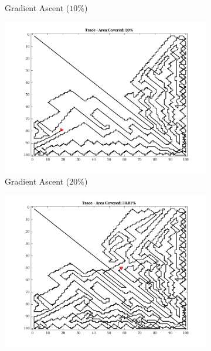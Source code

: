 \begin{figure}[htb!]
\begin{subfigure}[t]{0.32\textwidth}
        \ssp
        \captionsetup{skip=0.20\baselineskip,size=footnotesize}
        \caption{Gradient Ascent ($10\%$)}
    \end{subfigure}%
    \begin{subfigure}[t]{0.32\textwidth}
        \centering
        \includegraphics[width=\linewidth]{figures/hbresults/path_gradient_20p_100x100_sf_50_seed_2.png}
        \ssp
        \captionsetup{skip=0.20\baselineskip,size=footnotesize}
        \caption{Gradient Ascent ($20\%$)}
    \end{subfigure}%
    \begin{subfigure}[t]{0.32\textwidth}
        \centering
        \includegraphics[width=\linewidth]{figures/hbresults/path_gradient_30p_100x100_sf_50_seed_2.png}

\end{subfigure}
\end{figure}
